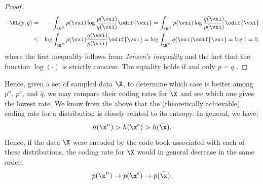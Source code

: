 \documentclass[../../book-main.tex]{subfiles}
\begin{document}
\begin{proof}
	\begin{eqnarray*}
		- \KL(p, q)
		&=& - \int_{\R^{D}} p(\vxi) \log \frac{p(\vxi)}{q(\vxi)} \odif{\vxi}
		=  \int_{\R^{D}} p(\vxi) \log \frac{q(\vxi)}{p(\vxi)} \odif{\vxi} \\
		&\le& \log \int_{\R^{D}} p(\vxi)  \frac{q(\vxi)}{p(\vxi)} \odif{\vxi} \label{eqn:jensen-KL}
		= \log \int_{\R^{D}} q(\vxi) \odif{\vxi} = \log 1 = 0,
	\end{eqnarray*}
	where the first inequality follows from {\em Jensen's inequality} and the fact that the function $\log(\cdot)$ is strictly concave. The equality holds if and only $p = q$ .
\end{proof}

Hence, given a set of sampled data $\X$, to determine which case is better among $p^{n}$, $p^{e}$,  and $\hat{q}$, we may compare their coding rates for $\X$ and see which one gives the lowest rate. We know from the above that the (theoretically achievable) coding rate for a distribution is closely related to its entropy. In general, we have:
\begin{equation}
	h(\x^n) > h(\x^e) > h(\hat \x).
\end{equation}
Hence, if the data $\X$ were encoded by the code book associated with each of these distributions, the coding rate for $\X$ would in general decrease in the same order:
\begin{equation}
	p(\x^n) \rightarrow p(\x^e) \rightarrow p(\hat \x).
\end{equation}
\end{document}
